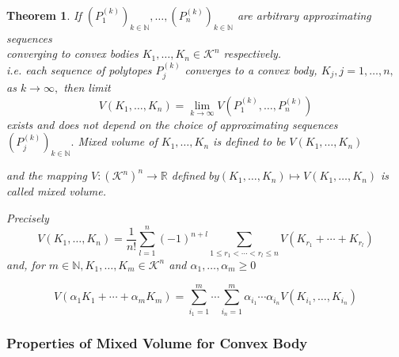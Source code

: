 \documentclass[oneside]{book}
\newtheorem{theorem}{Theorem}[section]
\begin{document}
 \begin{theorem}
 \label{t:10}
  If $\left(P_{1}^{(k)}\right)_{k \in \mathbb{N}}, \ldots,\left(P_{n}^{(k)}\right)_{k \in \mathbb{N}}$ are arbitrary approximating sequences\\
  
   converging to convex bodies  $K_{1}, \ldots, K_{n} \in \mathcal{K}^{n}$ respectively.
  \\
   i.e. each sequence of polytopes $P_{j}^{(k)}$ converges to a convex body, 
   $K_{j}, j=1, \ldots, n,$ as $k \rightarrow \infty,$ 
  then limit 
  \begin{equation}
  \label{eq51}
V\left(K_{1}, \ldots, K_{n}\right)=\lim _{k \rightarrow \infty} V\left(P_{1}^{(k)}, \ldots, P_{n}^{(k)}\right)
\end{equation}
exists and does not depend on the choice of approximating sequences $\left(P_{j}^{(k)}\right)_{k \in \mathbb{N}}. $ \newline
 Mixed volume of $K_{1}, \ldots, K_{n} $ is defined to be $V\left(K_{1}, \ldots, K_{n}\right)$ \newline
 
  and the mapping $V:\left(\mathcal{K}^{n}\right)^{n} \rightarrow \mathbb{R}$ defined $b y\left(K_{1}, \ldots, K_{n}\right) \mapsto V\left(K_{1}, \ldots, K_{n}\right)$ is called mixed volume.\newline
  
Precisely 
\begin{equation} 
\label{eq52}
V\left(K_{1}, \ldots, K_{n}\right)=\frac{1}{n !} \sum_{l=1}^{n}(-1)^{n+l} \sum_{1 \leq r_{1}<\cdots<r_{l} \leq n} V\left(K_{r_{1}}+\cdots+K_{r_{l}}\right)
\end{equation}
and, for $m \in \mathbb{N}, K_{1}, \ldots, K_{m} \in \mathcal{K}^{n}$ and $\alpha_{1}, \ldots, \alpha_{m} \geq 0$
 
 
\begin{equation}
\label{eq53}
V\left(\alpha_{1} K_{1}+\cdots+\alpha_{m} K_{m}\right)=\sum_{i_{1}=1}^{m} \cdots \sum_{i_{n}=1}^{m} \alpha_{i_{1}} \cdots \alpha_{i_{n}} V\left(K_{i_{1}}, \ldots, K_{i_{n}}\right)
\end{equation}
 \end{theorem}
 
 \subsubsection{Properties of Mixed Volume for Convex Body}
 
\end{document}
